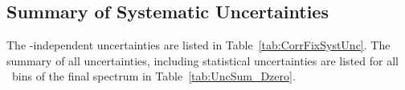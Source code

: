 \subsection{Summary of Systematic Uncertainties}

The \pt-independent uncertainties are listed in Table~\ref{tab:CorrFixSystUnc}. 
The summary of all uncertainties, including statistical uncertainties are listed for all \ptchjet\ bins of the final spectrum in Table~\ref{tab:UncSum_Dzero}.
%


    
